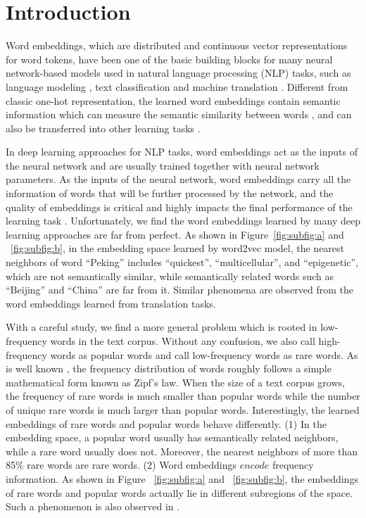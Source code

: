 \documentclass{article}
\begin{document}
\section{Introduction}
Word embeddings, which are distributed and continuous vector representations for word tokens, have been one of the basic building blocks for many neural network-based models used in natural language processing (NLP) tasks, such as language modeling \cite{kim2016character,jozefowicz2016exploring}, text classification \cite{maas2011learning,dai2015semi} and machine translation \cite{bahdanau2014neural,cho2014learning,wu2016google,vaswani2017attention,gehring2017convolutional}. Different from classic one-hot representation, the learned word embeddings contain semantic information which can measure the semantic similarity between words \cite{mikolov2013distributed}, and can also be transferred into other learning tasks \cite{mu2017all,arora2016simple}.

In deep learning approaches for NLP tasks, word embeddings act as the inputs of the neural network and are usually trained together with neural network parameters. As the inputs of the neural network, word embeddings carry all the information of words that will be further processed by the network, and the quality of embeddings is critical and highly impacts the final performance of the learning task \cite{hoffer2018fix}. Unfortunately, we find the word embeddings learned by many deep learning approaches are far from perfect. As shown in Figure~\ref{fig:subfig:a} and ~\ref{fig:subfig:b}, in the embedding space learned by word2vec model, the nearest neighbors of word ``Peking'' includes ``quickest”, ``multicellular”, and ``epigenetic”, which are not semantically similar, while semantically related words such as ``Beijing” and ``China” are far from it. Similar phenomena are observed from the word embeddings learned from translation tasks.

With a careful study, we find a more general problem which is rooted in low-frequency words in the text corpus. Without any confusion, we also call high-frequency words as popular words and call low-frequency words as rare words. As is well known \cite{larson2010introduction}, the frequency distribution of words roughly follows a simple mathematical form known as Zipf’s law. When the size of a text corpus grows, the frequency of rare words is much smaller than popular words while the number of unique rare words is much larger than popular words. Interestingly, the learned embeddings of rare words and popular words behave differently. (1) In the embedding space, a popular word usually has semantically related neighbors, while a rare word usually does not. Moreover, the nearest neighbors of more than 85\% rare words are rare words. (2) Word embeddings $encode$ frequency information. As shown in Figure ~\ref{fig:subfig:a} and ~\ref{fig:subfig:b}, the embeddings of rare words and popular words actually lie in different subregions of the space. Such a phenomenon is also observed in \cite{mu2017all}.
\end{document}
